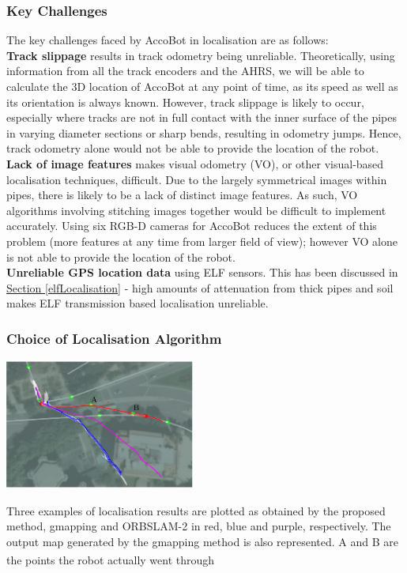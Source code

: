 \documentclass[11pt]{article}		%
\newcommand{\supercite}[1]{\textsuperscript{\cite{#1}}}		%
\newcommand{\sectref}[1]{\hyperref[#1]{Section \ref*{#1}}}     %
\begin{document}
		\subsubsection{Key Challenges}
		The key challenges faced by AccoBot in localisation are as follows: 
        \\ \hspace*{3ex}\textbf{Track slippage} results in track odometry being unreliable. Theoretically, using information from all the track encoders and the AHRS, we will be able to calculate the 3D location of AccoBot at any point of time, as its speed as well as its orientation is always known. However, track slippage is likely to occur, especially where tracks are not in full contact with the inner surface of the pipes in varying diameter sections or sharp bends, resulting in odometry jumps. Hence, track odometry alone would not be able to provide the location of the robot. 
        \\ \hspace*{3ex}\textbf{Lack of image features} makes visual odometry (VO), or other visual-based localisation techniques, difficult. Due to the largely symmetrical images within pipes, there is likely to be a lack of distinct image features. As such, VO algorithms involving stitching images together would be difficult to implement accurately. Using six RGB-D cameras for AccoBot reduces the extent of this problem (more features at any time from larger field of view); however VO alone is not able to provide the location of the robot. 
        \\ \hspace*{3ex}\textbf{Unreliable GPS location data} using ELF sensors. This has been discussed in \sectref{elfLocalisation} - high amounts of attenuation from thick pipes and soil makes ELF transmission based localisation unreliable. 

		\subsubsection{Choice of Localisation Algorithm}
        		
		\begin{floatingfigure}[r]{0.5\textwidth}
				\centering
				\includegraphics[width=0.47\textwidth]{localisationalgocomparison.jpg}
				\caption{Three examples of localisation results are plotted as obtained by the proposed method, gmapping and ORBSLAM-2 in red, blue and purple, respectively. The output map generated by the gmapping method is also represented. A and B are the points the robot actually went through\supercite{ELFTransmitter}}
				\label{localisationExamples}
		\end{floatingfigure}
		
\end{document}
